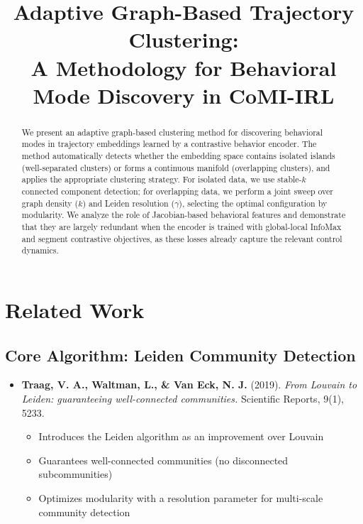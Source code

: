 \documentclass[11pt,a4paper]{article}
\title{\textbf{Adaptive Graph-Based Trajectory Clustering:\\A Methodology for Behavioral Mode Discovery in CoMI-IRL}}
\author{}
\date{}
\begin{document}
\maketitle

\begin{abstract}
We present an adaptive graph-based clustering method for discovering behavioral modes in trajectory embeddings learned by a contrastive behavior encoder. The method automatically detects whether the embedding space contains isolated islands (well-separated clusters) or forms a continuous manifold (overlapping clusters), and applies the appropriate clustering strategy. For isolated data, we use stable-$k$ connected component detection; for overlapping data, we perform a joint sweep over graph density ($k$) and Leiden resolution ($\gamma$), selecting the optimal configuration by modularity. We analyze the role of Jacobian-based behavioral features and demonstrate that they are largely redundant when the encoder is trained with global-local InfoMax and segment contrastive objectives, as these losses already capture the relevant control dynamics.
\end{abstract}

\tableofcontents
\newpage

\section{Related Work}

\subsection{Core Algorithm: Leiden Community Detection}

\begin{itemize}[leftmargin=*]
    \item \textbf{Traag, V. A., Waltman, L., \& Van Eck, N. J.} (2019). \textit{From Louvain to Leiden: guaranteeing well-connected communities.} Scientific Reports, 9(1), 5233.
    \begin{itemize}
        \item Introduces the Leiden algorithm as an improvement over Louvain
        \item Guarantees well-connected communities (no disconnected subcommunities)
        \item Optimizes modularity with a resolution parameter for multi-scale community detection
    \end{itemize}
\end{itemize}
\end{document}
